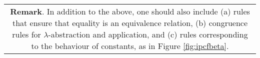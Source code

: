 \begin{tabular}{c c}
  \\

  \multicolumn{2}{c}{
    \begin{minipage}{\textwidth}
      \textbf{Remark}. In addition to the above, one should also
      include (a) rules that ensure that equality is an equivalence
      relation, (b) congruence rules for $\lambda$-abstraction and
      application, and (c) rules corresponding to the behaviour of
      constants, as in Figure \ref{fig:ipcfbeta}. 
    \end{minipage}
  }

\end{tabular}
